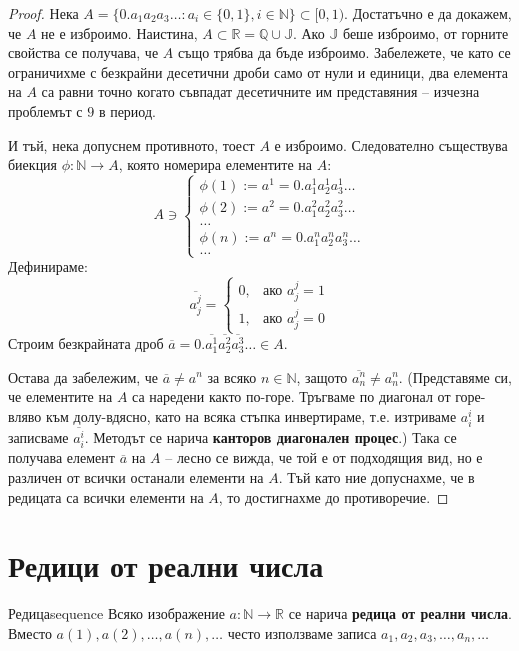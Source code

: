 \begin{proof}
Нека $A = \{0.a_1a_2a_3\dots : a_i \in \{0, 1\}, i \in \mathbb{N}\} \subset [0, 1)$. Достатъчно е да докажем, че $A$ не е изброимо. Наистина, $A \subset \mathbb{R} = \mathbb{Q} \cup \mathbb{J}$. Ако $\mathbb{J}$ беше изброимо, от горните свойства се получава, че $A$ също трябва да бъде изброимо. Забележете, че като се ограничихме с безкрайни десетични дроби само от нули и единици, два елемента на $A$ са равни точно когато съвпадат десетичните им представяния -- изчезна проблемът с $9$ в период.

И тъй, нека допуснем противното, тоест $A$ е изброимо. Следователно съществува биекция $\phi : \mathbb{N} \to A$, която номерира елементите на $A$:
\[
A \ni 
\begin{cases}
\phi(1) := a^1 = 0.a_1^1 a_2^1 a_3^1 \dots \\
\phi(2) := a^2 = 0.a_1^2 a_2^2 a_3^2 \dots \\
\dots \\
\phi(n) := a^n = 0.a_1^n a_2^n a_3^n \dots \\
\dots
\end{cases}
\]
Дефинираме:
\[
\overline{a_j^j} = 
\begin{cases}
0, & \text{ако } a_j^j = 1 \\
1, & \text{ако } a_j^j = 0
\end{cases}
\]
Строим безкрайната дроб $\overline{a} = 0.\overline{a_1^1}\overline{a_2^2}\overline{a_3^3}\dots \in A$.

Остава да забележим, че $\overline{a} \neq a^n$ за всяко $n \in \mathbb{N}$, защото $\overline{a_n^n} \neq a_n^n$. (Представяме си, че елементите на $A$ са наредени както по-горе. Тръгваме по диагонал от горе-вляво към долу-вдясно, като на всяка стъпка инвертираме, т.е. изтриваме $a_i^i$ и записваме $\overline{a_i^i}$. Методът се нарича \textbf{канторов диагонален процес}.) Така се получава елемент $\overline{a}$ на $A$ -- лесно се вижда, че той е от подходящия вид, но е различен от всички останали елементи на $A$. Тъй като ние допуснахме, че в редицата са всички елементи на $A$, то достигнахме до противоречие.
\end{proof}

\chapter{Редици от реални числа}

\begin{definition}{Редица}{sequence}
Всяко изображение $a : \mathbb{N} \to \mathbb{R}$ се нарича \textbf{редица от реални числа}. Вместо $a(1), a(2), \dots, a(n), \dots$ често използваме записа $a_1, a_2, a_3, \dots, a_n, \dots$
\end{definition}

